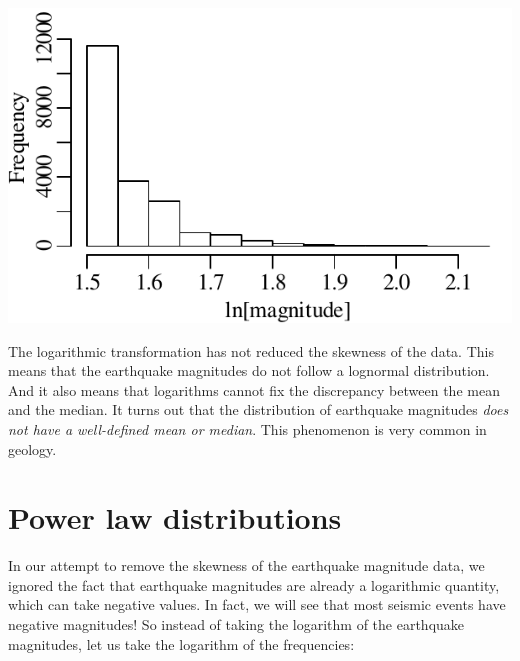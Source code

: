 \noindent\begin{minipage}[t][][b]{.4\textwidth}
  \includegraphics[width=\textwidth]{../figures/recentlogquakes.pdf}\medskip
\end{minipage}
\begin{minipage}[t][][t]{.6\textwidth}
  \label{fig:recentlogquakes}
\end{minipage}

The logarithmic transformation has not reduced the skewness of the
data. This means that the earthquake magnitudes do not follow a
lognormal distribution. And it also means that logarithms cannot fix
the discrepancy between the mean and the median. It turns out that the
distribution of earthquake magnitudes \emph{does not have a
well-defined mean or median}. This phenomenon is very common in
geology.

\section{Power law distributions}
\label{sec:power-law}

In our attempt to remove the skewness of the earthquake magnitude
data, we ignored the fact that earthquake magnitudes are already a
logarithmic quantity, which can take negative values. In fact, we will
see that most seismic events have negative magnitudes!  So instead of
taking the logarithm of the earthquake magnitudes, let us take the
logarithm of the frequencies:

